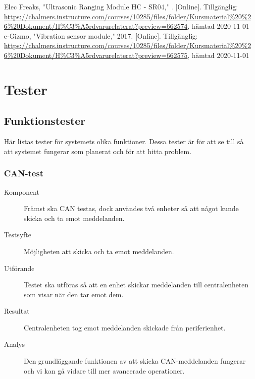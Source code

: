 \documentclass[a4paper]{article}
\newcommand{\citewebpage}[6]{\noindent [#1] #2, "#3," #4. [Online]. Tillgänglig: \url{#5},  hämtad #6\\}
\begin{document}
\citewebpage{3}{Elec Freaks}{Ultrasonic Ranging Module HC - SR04}{}{https://chalmers.instructure.com/courses/10285/files/folder/Kursmaterial\%20\%26\%20Dokument/H\%C3\%A5rdvarurelaterat?preview=662574}{2020-11-01}

\citewebpage{4}{e-Gizmo}{Vibration sensor module}{2017}{https://chalmers.instructure.com/courses/10285/files/folder/Kursmaterial\%20\%26\%20Dokument/H\%C3\%A5rdvarurelaterat?preview=662575}{2020-11-01}

\newpage
\appendix
\section{Tester}
\label{bilaga-tester}
\subsection{Funktionstester}
Här listas tester för systemets olika funktioner.
Dessa tester är för att se till så att systemet fungerar som planerat och för att hitta problem.

\subsubsection{CAN-test}
\begin{description}
\item[Komponent] Främst ska CAN testas, dock användes två enheter så att något kunde skicka och ta emot meddelanden.

\item[Testsyfte] Möjligheten att skicka och ta emot meddelanden.

\item[Utförande] Testet ska utföras så att en enhet skickar meddelanden till centralenheten som visar när den tar emot dem.

\item[Resultat] Centralenheten tog emot meddelanden skickade från periferienhet.

\item[Analys] Den grundläggande funktionen av att skicka CAN-meddelanden fungerar och vi kan gå vidare till mer avancerade operationer.
\end{description}
\end{document}
